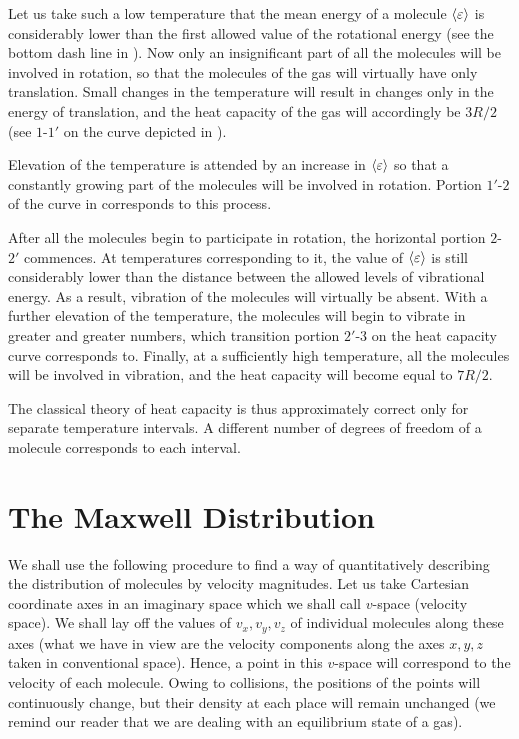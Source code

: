 Let us take such a low temperature that the mean energy of a molecule $\left\langle \varepsilon \right\rangle$ is considerably lower than the first allowed value of the rotational energy (see the bottom dash line in ). Now only an insignificant part of all the molecules will be involved in rotation, so that the molecules of the gas will virtually have only translation. Small changes in the temperature will result in changes only in the energy of translation, and the heat capacity of the gas will accordingly be $3R/2$ (see $1$-$1'$ on the curve depicted in ).

Elevation of the temperature is attended by an increase in $\left\langle \varepsilon \right\rangle$ so that a constantly growing part of the molecules will be involved in rotation. Portion $1'$-$2$ of the curve in  corresponds to this process.

After all the molecules begin to participate in rotation, the horizontal portion $2$-$2'$ commences. At temperatures corresponding to it, the value of $\left\langle \varepsilon \right\rangle$ is still considerably lower than the distance between the allowed levels of vibrational energy. As a result, vibration of the molecules will virtually be absent. With a further elevation of the temperature, the molecules will begin to vibrate in greater and greater numbers, which transition portion $2'$-$3$ on the heat capacity curve corresponds to. Finally, at a sufficiently high temperature, all the molecules will be involved in vibration, and the heat capacity will become equal to $7R/2$.

The classical theory of heat capacity is thus approximately correct only for separate temperature intervals. A different number of degrees of freedom of a molecule corresponds to each interval.

\section{The Maxwell Distribution}\label{sec:11_6}

We shall use the following procedure to find a way of quantitatively describing the distribution of molecules by velocity magnitudes. Let us take Cartesian coordinate axes in an imaginary space which we shall call $v$-space (velocity space). We shall lay off the values of $v_x, v_y, v_z$ of individual molecules along these axes (what we have in view are the velocity components along the axes $x, y, z$ taken in conventional space). Hence, a point in this $v$-space will correspond to the velocity of each molecule. Owing to collisions, the positions of the points will continuously change, but their density at each place will remain unchanged (we remind our reader that we are dealing with an equilibrium state of a gas).

